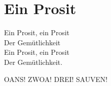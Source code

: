 \section{Ein Prosit}
Ein Prosit, ein Prosit \\
Der Gemütlichkeit \\
Ein Prosit, ein Prosit\\ 
Der Gemütlichkeit.

OANS! ZWOA! DREI! SAUVEN!

